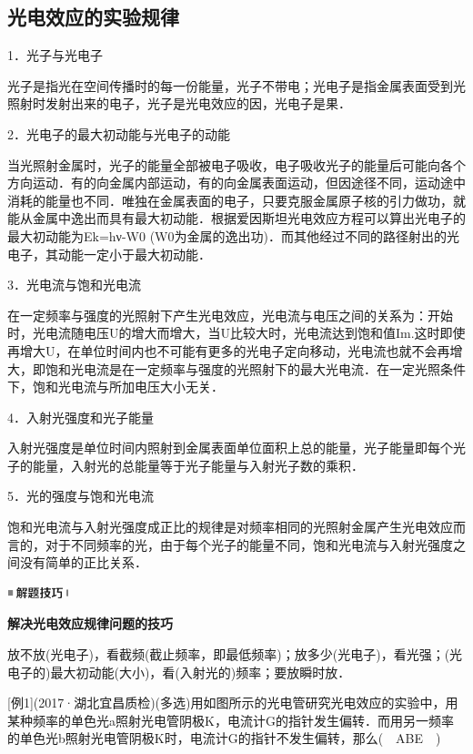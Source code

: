 \newpage
\subsection{光电效应的实验规律}

1．光子与光电子

光子是指光在空间传播时的每一份能量，光子不带电；光电子是指金属表面受到光照射时发射出来的电子，光子是光电效应的因，光电子是果．

2．光电子的最大初动能与光电子的动能

当光照射金属时，光子的能量全部被电子吸收，电子吸收光子的能量后可能向各个方向运动．有的向金属内部运动，有的向金属表面运动，但因途径不同，运动途中消耗的能量也不同．唯独在金属表面的电子，只要克服金属原子核的引力做功，就能从金属中逸出而具有最大初动能．根据爱因斯坦光电效应方程可以算出光电子的最大初动能为Ek=hν-W0
(W0为金属的逸出功)．而其他经过不同的路径射出的光电子，其动能一定小于最大初动能．

3．光电流与饱和光电流

在一定频率与强度的光照射下产生光电效应，光电流与电压之间的关系为：开始时，光电流随电压U的增大而增大，当U比较大时，光电流达到饱和值Im.这时即使再增大U，在单位时间内也不可能有更多的光电子定向移动，光电流也就不会再增大，即饱和光电流是在一定频率与强度的光照射下的最大光电流．在一定光照条件下，饱和光电流与所加电压大小无关．

4．入射光强度和光子能量

入射光强度是单位时间内照射到金属表面单位面积上总的能量，光子能量即每个光子的能量，入射光的总能量等于光子能量与入射光子数的乘积．

5．光的强度与饱和光电流

饱和光电流与入射光强度成正比的规律是对频率相同的光照射金属产生光电效应而言的，对于不同频率的光，由于每个光子的能量不同，饱和光电流与入射光强度之间没有简单的正比关系．

\begin{center}\includegraphics[width=0.70764in,height=0.12292in]{media/image37.png}\end{center}
\begin{center}
  \textbf{解决光电效应规律问题的技巧}
\end{center}

放不放(光电子)，看截频(截止频率，即最低频率)；放多少(光电子)，看光强；(光电子的)最大初动能(大小)，看(入射光的)频率；要放瞬时放．

{[}例1{]}(2017·湖北宜昌质检)(多选)用如图所示的光电管研究光电效应的实验中，用某种频率的单色光a照射光电管阴极K，电流计G的指针发生偏转．而用另一频率的单色光b照射光电管阴极K时，电流计G的指针不发生偏转，那么(　ABE　)

